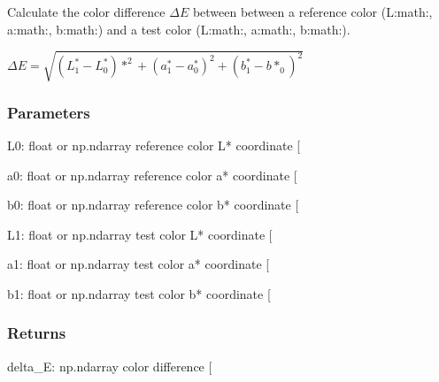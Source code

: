 \documentclass[letterpaper,10pt,english]{sphinxmanual}
\begin{document}
\begin{fulllineitems}
\label{\detokenize{07_colors:skinoptics.colors.Delta_E}}
\pysigstartsignatures
{}
\pysigstopsignatures
\sphinxAtStartPar
Calculate the color difference \(\Delta E\) between between
a reference color (L:math:, a:math:, b:math:) and
a test color (L:math:, a:math:, b:math:).

\sphinxAtStartPar
\(\Delta E = \sqrt{(L^*_1 - L^*_0)*^2 + (a^*_1 - a^*_0)^2 + (b^*_1 - b*_0)^2}\)


\subsubsection{Parameters}
\label{\detokenize{07_colors:parameters}}
\sphinxAtStartPar
L0: float or np.ndarray
reference color L* coordinate {[}\sphinxhyphen{}{]}

\sphinxAtStartPar
a0: float or np.ndarray
reference color a* coordinate {[}\sphinxhyphen{}{]}

\sphinxAtStartPar
b0: float or np.ndarray
reference color b* coordinate {[}\sphinxhyphen{}{]}

\sphinxAtStartPar
L1: float or np.ndarray
test color L* coordinate {[}\sphinxhyphen{}{]}

\sphinxAtStartPar
a1: float or np.ndarray
test color a* coordinate {[}\sphinxhyphen{}{]}

\sphinxAtStartPar
b1: float or np.ndarray
test color b* coordinate {[}\sphinxhyphen{}{]}


\subsubsection{Returns}
\label{\detokenize{07_colors:returns}}
\sphinxAtStartPar
delta\_E: np.ndarray
color difference {[}\sphinxhyphen{}{]}

\end{fulllineitems}
\end{document}
